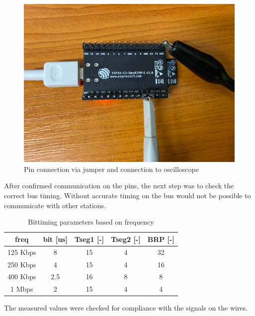 \documentclass{ctuthesis}
\begin{document}
  \begin{figure}[htb]
 \includegraphics[width=1\textwidth]{images/jumper.pdf}
 \caption{Pin connection via jumper and connection to oscilloscope}
 \end{figure}

 
 After confirmed communication on the pins, the next step was to check the correct bus timing. Without accurate timing on the bus would not be possible to communicate with other stations.
 \clearpage
 
\begin{table}[]
\centering
\begin{tabular}{|c|c|c|c|c|}
\hline
freq     & bit {[}us{]} & Tseg1 {[}-{]} & Tseg2 {[}-{]} & BRP {[}-{]} \\ \hline
125 Kbps & 8            & 15            & 4             & 32          \\ \hline
250 Kbps & 4            & 15            & 4             & 16          \\ \hline
400 Kbps & 2.5          & 16            & 8             & 8           \\ \hline
1 Mbps   & 2            & 15            & 4             & 4           \\ \hline
\end{tabular}
\caption{Bittiming parameters based on frequency}
\label{tab:my-table}
\end{table}

 The measured values were checked for compliance with the signals on the wires.
\end{document}

